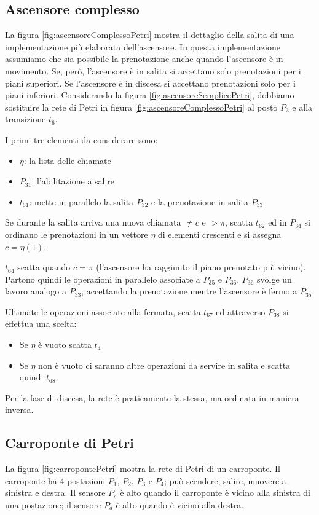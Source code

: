 \documentclass[a4paper]{report}
\begin{document}
\subsection{Ascensore complesso}

La figura \ref{fig:ascensoreComplessoPetri} mostra il dettaglio della
salita di una implementazione pi\`u elaborata dell'ascensore. In
questa implementazione assumiamo che sia possibile la prenotazione
anche quando l'ascensore \`e in movimento. Se, per\`o, l'ascensore \`e
in salita si accettano solo prenotazioni per i piani superiori. Se
l'ascensore \`e in discesa si accettano prenotazioni solo per i piani
inferiori. Considerando la figura \ref{fig:ascensoreSemplicePetri}, dobbiamo
sostituire la rete di Petri in figura
\ref{fig:ascensoreComplessoPetri} al posto $P_3$ e alla transizione
$t_6$.

I primi tre elementi da considerare sono:
\begin{itemize}
\item $\eta$: la lista delle chiamate
\item $P_{31}$: l'abilitazione a salire
\item $t_{61}$: mette in parallelo la salita $P_{32}$ e la
  prenotazione in salita $P_{33}$
\end{itemize}

Se durante la salita arriva una nuova chiamata $\neq \bar{c}$ e $>
\pi$, scatta $t_{62}$ ed in $P_{34}$ si ordinano le prenotazioni in un
vettore $\eta$ di elementi crescenti e si assegna $\bar{c} = \eta(1)$.

$t_{64}$ scatta quando $\bar{c} = \pi$ (l'ascensore ha raggiunto il
piano prenotato pi\`u vicino). Partono quindi le operazioni in
parallelo associate a $P_{35}$ e $P_{36}$. $P_{36}$ svolge un lavoro
analogo a $P_{33}$, accettando la prenotazione mentre l'ascensore \`e
fermo a $P_{35}$.

Ultimate le operazioni associate alla fermata, scatta $t_{67}$ ed
attraverso $P_{38}$ si effettua una scelta:
\begin{itemize}
\item Se $\eta$ \`e vuoto scatta $t_4$
\item Se $\eta$ non \`e vuoto ci saranno altre operazioni da servire
  in salita e scatta quindi $t_{68}$.
\end{itemize}

Per la fase di discesa, la rete \`e praticamente la stessa, ma ordinata
in maniera inversa.

\subsection{Carroponte di Petri}

La figura \ref{fig:carropontePetri} mostra la rete di Petri di un
carroponte. Il carroponte ha 4 postazioni $P_1$, $P_2$, $P_3$ e
$P_4$; pu\`o scendere, salire, muovere a sinistra e destra.  Il
sensore $P_s$ \`e alto quando il carroponte \`e vicino alla 
sinistra di una postazione; il sensore $P_d$ \`e alto quando \`e
vicino alla destra.
\end{document}
